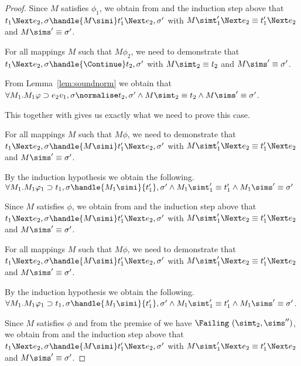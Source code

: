 \begin{proof}
{  Since $M$ satisfies $\phi_1$, we obtain from  and the induction step above that $t_1\Next e_2,\sigma\handle{M \simi} t_1'\Next e_2,\sigma'$ with
  $M \simt_1' \Next e_2 \equiv {t_1'}\Next e_2$ and $M\sims'\equiv{\sigma'}$.



  For all mappings $M$ such that $M\phi_2$, we need to demonstrate that\\
  $t_1\Next e_2,\sigma\handle{\Continue}t_2,\sigma'$ with
  $M \simt_2 \equiv {t_2}$ and $M\sims'\equiv{\sigma'}$.

  From Lemma~\ref{lem:soundnorm} we obtain that $\forall M_1. M_1 \phi \implies e_2 v_1,\sigma{\normalise}{t_2},{\sigma'}\land M \simt_2\equiv{t_2}\land M \sims'\equiv{\sigma'}$.

  This together with  gives us exactly what we need to prove this case.
    }

  {
  For all mappings $M$ such that $M\phi$, we need to demonstrate that\\
  $t_1\Next e_2,\sigma\handle{M\simi}t_1'\Next e_2,\sigma'$ with
  $M \simt_1' \Next e_2 \equiv {t_1'}\Next e_2$ and $M\sims'\equiv{\sigma'}$.

  By the induction hypothesis we obtain the following.\\
  $\forall M_1 . M_1 \phi_1 \implies t_1,\sigma \handle{M_1 \simi} {t_1'},{\sigma'}\land M_1 \simt_1'\equiv{t_1'}\land M_1\sims' \equiv {\sigma'}$

  Since $M$ satisfies $\phi$, we obtain from  and the induction step above that $t_1\Next e_2,\sigma\handle{M\simi}t_1'\Next e_2,\sigma'$ with
  $M \simt_1' \Next e_2 \equiv {t_1'}\Next e_2$ and $M\sims'\equiv{\sigma'}$.
  }

    {
    For all mappings $M$ such that $M\phi$, we need to demonstrate that\\
    $t_1\Next e_2,\sigma\handle{M\simi}t_1'\Next e_2,\sigma'$ with
    $M \simt_1' \Next e_2 \equiv {t_1'}\Next e_2$ and $M\sims'\equiv{\sigma'}$.

    By the induction hypothesis we obtain the following.\\
    $\forall M_1 . M_1 \phi_1 \implies t_1,\sigma \handle{M_1 \simi} {t_1'},{\sigma'}\land M_1 \simt_1'\equiv{t_1'}\land M_1\sims' \equiv {\sigma'}$.

    Since $M$ satisfies $\phi$ and from the premise of  we have $\Failing\ (\simt_2,\sims'')$, we obtain from  and the induction step above that $t_1\Next e_2,\sigma\handle{M\simi}t_1'\Next e_2,\sigma'$ with
    $M \simt_1' \Next e_2 \equiv {t_1'}\Next e_2$ and $M\sims'\equiv{\sigma'}$.
    }


\end{proof}
